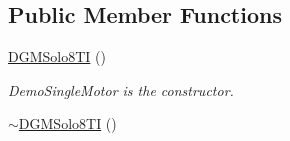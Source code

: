 \subsection*{Public Member Functions}
\begin{DoxyCompactItemize}
\item 
\hyperlink{classdg__blmc__robots_1_1DGMSolo8TI_abee90d8f11708199fca29849b559cc81}{D\+G\+M\+Solo8\+TI} ()\hypertarget{classdg__blmc__robots_1_1DGMSolo8TI_abee90d8f11708199fca29849b559cc81}{}\label{classdg__blmc__robots_1_1DGMSolo8TI_abee90d8f11708199fca29849b559cc81}

\begin{DoxyCompactList}\small\item\em Demo\+Single\+Motor is the constructor. \end{DoxyCompactList}\item 
\hyperlink{classdg__blmc__robots_1_1DGMSolo8TI_adc55a8663b9682a54c50dea30ef66eaf}{$\sim$\+D\+G\+M\+Solo8\+TI} ()\hypertarget{classdg__blmc__robots_1_1DGMSolo8TI_adc55a8663b9682a54c50dea30ef66eaf}{}\label{classdg__blmc__robots_1_1DGMSolo8TI_adc55a8663b9682a54c50dea30ef66eaf}


\end{DoxyCompactItemize}
